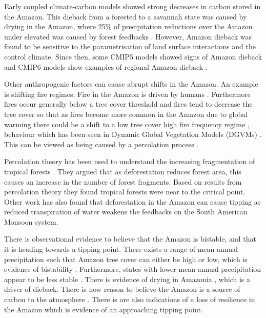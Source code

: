 Early coupled climate-carbon models \parencite{Cox2000} showed strong decreases in carbon stored in the Amazon. This dieback \parencite{Cox2004}  from a forested to a savannah state was
caused by drying in the Amazon, where 25\% of precipitation reductions over the Amazon under elevated  was caused by forest feedbacks \parencite{Betts2004}.
However, Amazon dieback was found to be sensitive to the parametrisation of land surface interactions and the control climate\parencite{Huntingford2004}. Since then,
some CMIP5 models \parencite{Drijfhout2015} showed signs of Amazon dieback and CMIP6 models show examples of regional Amazon dieback \parencite{Parry2022}.

Other anthropogenic factors can cause abrupt shifts in the Amazon. An example is shifting fire regimes. Fire in the Amazon is driven by humans \parencite{UNEP2002}.
Furthermore fires occur generally below a tree cover threshold \parencite{Wuyts2017} and fires tend to decrease the tree cover so that as fires become more common in the
Amazon due to global warming \parencite{Cochrane2009} there could be a shift to a low tree cover high fire frequency regime \parencite{Wuyts2022}, behaviour
which has been seen in Dynamic Global Vegetation Models (DGVMs) \parencite{Lasslop2016}. This can be viewed
as being caused by a percolation process \parencite{Schertzer2015,Cardoso2022}.

Percolation theory has been used to understand the increasing fragmentation of tropical forests \parencite{Taubert2018}. They argued that as deforestation reduces forest area,
this causes an increase in the number of forest fragments. Based on results from percolation theory \parencite{Stauffer1994} they found tropical forests were near to the critical point.
Other work \parencite{Boers2017} has also found that deforestation in the Amazon can cause tipping as reduced transpiration of water weakens the feedbacks on the South American Monsoon system. 

There is observational evidence to believe that the Amazon is bistable, and that it is heading towards a tipping point. There exists a range of mean annual precipitation
such that Amazon tree cover can either be high or low, which is evidence of bistability \parencite{Hirota2011,Staver2011}.  Furthermore, states with lower mean annual
precipitation appear to be less stable \parencite{Ciemer2019}. There is evidence of drying in Amazonia \parencite{Ritchie2022}, which is a driver of dieback. There is now reason to
believe the Amazon is a source of carbon to the atmosphere \parencite{Gatti2021}. There is are also indications of a loss of resilience in the Amazon \parencite{Boulton2022} which is
evidence of an approaching tipping point.

